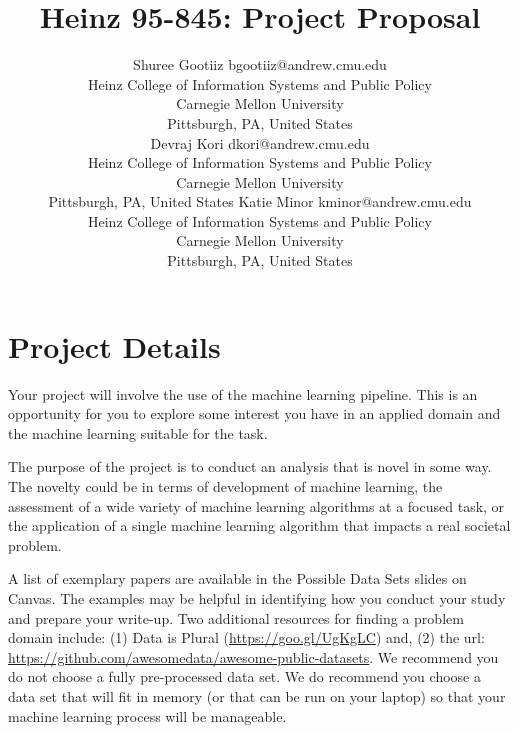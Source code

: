 \documentclass[twoside,11pt]{article}
\begin{document}
\title{Heinz 95-845: Project Proposal}

\author{\name Shuree Gootiiz \email bgootiiz@andrew.cmu.edu \\
       \addr Heinz College of Information Systems and Public Policy\\
       Carnegie Mellon University\\
       Pittsburgh, PA, United States \\
       \AND
       \name Devraj Kori \email dkori@andrew.cmu.edu \\
       \addr Heinz College of Information Systems and Public Policy\\
       Carnegie Mellon University\\
       Pittsburgh, PA, United States
       \AND
       \name Katie Minor \email kminor@andrew.cmu.edu \\
       \addr Heinz College of Information Systems and Public Policy\\
       Carnegie Mellon University\\
       Pittsburgh, PA, United States}
       
\maketitle


\section{Project Details}
Your project will involve the use of the machine learning pipeline. This is an opportunity for you to explore some interest you have in an applied domain and the machine learning suitable for the task.

The purpose of the project is to conduct an analysis that is novel in some way. The novelty could be in terms of development of machine learning, the assessment of a wide variety of machine learning algorithms at a focused task, or the application of a single machine learning algorithm that impacts a real societal problem.

A list of exemplary papers are available in the Possible Data Sets slides on Canvas. The examples may be helpful in identifying how you conduct your study and prepare your write-up. Two additional resources for finding a problem domain include: (1) Data is Plural (\url{https://goo.gl/UgKgLC}) and, (2) the url: \url{https://github.com/awesomedata/awesome-public-datasets}. We recommend you do not choose a fully pre-processed data set. We do recommend you choose a data set that will fit in memory (or that can be run on your laptop) so that your machine learning process will be manageable.
\end{document}
